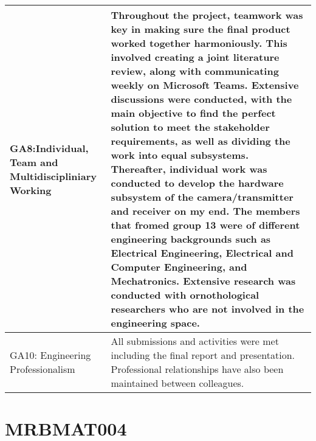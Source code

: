 \documentclass[class=report,11pt,crop=false]{standalone}
\begin{document}
\begin{tabularx}{\textwidth}{|p{} X|}
    GA8:Individual, Team and Multidiscipliniary Working & Throughout the project, teamwork was key in making sure the final product worked together harmoniously. This involved creating a joint literature review, along with communicating weekly on Microsoft Teams. Extensive discussions were conducted, with the main objective to find the perfect solution to meet the stakeholder requirements, as well as dividing the work into equal subsystems. Thereafter, individual work was conducted to develop the hardware subsystem of the camera/transmitter and receiver on my end. The members that fromed group 13 were of different engineering backgrounds such as Electrical Engineering, Electrical and Computer Engineering, and Mechatronics. Extensive research was conducted with ornothological researchers who are not involved in the engineering space. \\ \hline

    GA10: Engineering Professionalism & All submissions and activities were met including the final report and presentation. Professional relationships have also been maintained between colleagues. \\ \hline


\end{tabularx}
\raggedright




\section{MRBMAT004}
\end{document}
